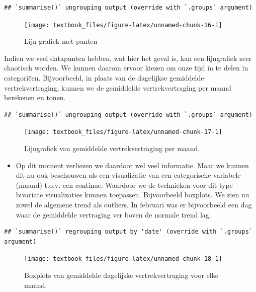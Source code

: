 \documentclass[]{tufte-book}
\providecommand{\tightlist}{%
  \setlength{\itemsep}{0pt}\setlength{\parskip}{0pt}}
\begin{document}
\begin{verbatim}
## `summarise()` ungrouping output (override with `.groups` argument)
\end{verbatim}

\begin{figure}
\texttt{[image: textbook\_files/figure-latex/unnamed-chunk-16-1]} \caption[Lijn grafiek met punten]{Lijn grafiek met punten}\label{fig:unnamed-chunk-16}
\end{figure}

Indien we veel datapunten hebben, wat hier het geval is, kan een lijngrafiek zeer chaotisch worden. We kunnen daarom ervoor kiezen om onze tijd in te delen in categoriëen. Bijvoorbeeld, in plaats van de dagelijkse gemiddelde vertrekvertraging, kunnen we de gemiddelde vertrekvertraging per maand berekenen en tonen.

\begin{verbatim}
## `summarise()` ungrouping output (override with `.groups` argument)
\end{verbatim}

\begin{figure}
\texttt{[image: textbook\_files/figure-latex/unnamed-chunk-17-1]} \caption[Lijngrafiek van gemiddelde vertrekvertraging per maand]{Lijngrafiek van gemiddelde vertrekvertraging per maand.}\label{fig:unnamed-chunk-17}
\end{figure}

\begin{itemize}
\tightlist
\item
  Op dit moment verliezen we daardoor wel veel informatie. Maar we kunnen dit nu ook beschouwen als een visualizatie van een categorische variabele (maand) t.o.v. een continue. Waardoor we de technieken voor dit type bivariate visualizaties kunnen toepassen. Bijvoorbeeld boxplots. We zien nu zowel de algemene trend als outliers. In februari was er bijvoorbeeld een dag waar de gemiddelde vertraging ver boven de normale trend lag.
\end{itemize}

\begin{verbatim}
## `summarise()` regrouping output by 'date' (override with `.groups` argument)
\end{verbatim}

\begin{figure}
\texttt{[image: textbook\_files/figure-latex/unnamed-chunk-18-1]} \caption[Boxplots van gemiddelde dagelijske vertrekvertraging voor elke maand]{Boxplots van gemiddelde dagelijske vertrekvertraging voor elke maand.}\label{fig:unnamed-chunk-18}
\end{figure}
\end{document}
